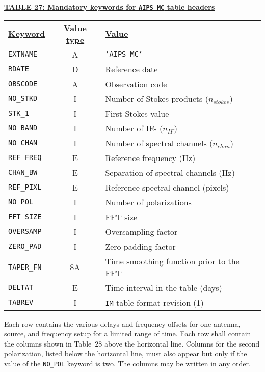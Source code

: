 \documentclass[twoside]{article}
\newcommand{\nstokes}{$n_{stokes}$}
\newcommand{\nif}{$n_{IF}$}
\newcommand{\nchan}{$n_{chan}$}
\begin{document}
\begin{center}
\underline{\bf{TABLE 27: Mandatory keywords for {\tt AIPS MC} table
    headers}}\\
\begin{tabular}{lcl}
\noalign{\vspace{2pt}} \label{ta:MCkeys}
\underline{{\bf Keyword}} & \underline{\bf{Value type}} &
    \underline{\bf{Value\vphantom{y}}} \\
\noalign{\vspace{2pt}}
{\tt EXTNAME}   & A & {\tt 'AIPS MC'}  \\
{\tt RDATE}     & D & Reference date \\
{\tt OBSCODE}   & A & Observation code \\
{\tt NO\_STKD}  & I & Number of Stokes products (\nstokes) \\
{\tt STK\_1}    & I & First Stokes value \\
{\tt NO\_BAND}  & I & Number of IFs (\nif)\\
{\tt NO\_CHAN}  & I & Number of spectral channels (\nchan) \\
{\tt REF\_FREQ} & E & Reference frequency (Hz) \\
{\tt CHAN\_BW}  & E & Separation of spectral channels (Hz) \\
{\tt REF\_PIXL} & E & Reference spectral channel (pixels) \\
{\tt NO\_POL}   & I & Number of polarizations \\
{\tt FFT\_SIZE} & I & FFT size \\
{\tt OVERSAMP}  & I & Oversampling factor \\
{\tt ZERO\_PAD} & I & Zero padding factor \\
{\tt TAPER\_FN} & 8A & Time smoothing function prior to the FFT \\
{\tt DELTAT}    & E & Time interval in the table (days) \\
{\tt TABREV}    & I & {\tt IM} table format revision (1)
\end{tabular}
\end{center}

Each row contains the various delays and frequency offsets for one
antenna, source, and frequency setup for a limited range of time.
Each row shall contain the columns shown in Table~28 above the
horizontal line.  Columns for the second polarization, listed below
the horizontal line, must also appear but only if the value of the
{\tt NO\_POL} keyword is two.  The columns may be written in any
order.
\end{document}
